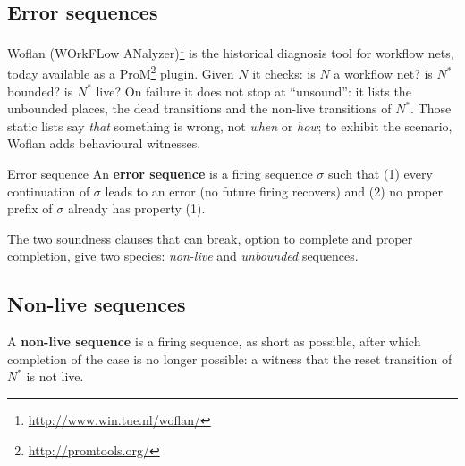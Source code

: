 \subsection{Error sequences}

Woflan (WOrkFLow ANalyzer)\footnote{\url{http://www.win.tue.nl/woflan/}} is the historical diagnosis tool for workflow nets, today available as a ProM\footnote{\url{http://promtools.org/}} plugin. Given $N$ it checks: is $N$ a workflow net? is $N^{*}$ bounded? is $N^{*}$ live? On failure it does not stop at ``unsound'': it lists the unbounded places, the dead transitions and the non-live transitions of $N^{*}$. Those static lists say \emph{that} something is wrong, not \emph{when} or \emph{how}; to exhibit the scenario, Woflan adds behavioural witnesses.
\begin{definitionbox}{Error sequence}
An \textbf{error sequence} is a firing sequence $\sigma$ such that (1) every continuation of $\sigma$ leads to an error (no future firing recovers) and (2) no proper prefix of $\sigma$ already has property (1).
\end{definitionbox}
The two soundness clauses that can break, option to complete and proper completion, give two species: \emph{non-live} and \emph{unbounded} sequences.

\subsection{Non-live sequences}

\begin{definition}
A \textbf{non-live sequence} is a firing sequence, as short as possible, after which completion of the case is no longer possible: a witness that the reset transition of $N^{*}$ is not live.
\end{definition}

